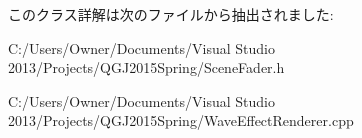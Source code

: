 このクラス詳解は次のファイルから抽出されました\+:\begin{DoxyCompactItemize}
\item 
C\+:/\+Users/\+Owner/\+Documents/\+Visual Studio 2013/\+Projects/\+Q\+G\+J2015\+Spring/Scene\+Fader.\+h\item 
C\+:/\+Users/\+Owner/\+Documents/\+Visual Studio 2013/\+Projects/\+Q\+G\+J2015\+Spring/Wave\+Effect\+Renderer.\+cpp\end{DoxyCompactItemize}
